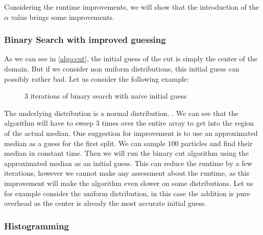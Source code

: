 \documentclass[]{article}
\begin{document}
Considering the runtime improvements, we will show that the introduction of the $\alpha$ value brings some improvements. 

\subsubsection{Binary Search with improved guessing}

As we can see in \ref{algo:cut}, the initial guess of the cut is simply the center of the domain. But if we consider non uniform distributions, this initial guess can possibly rather bad. Let us consider the following example:

\begin{figure}[H]
	\begin{center}
	\end{center}
	\caption{3 iterations of binary search with naive initial guess}\label{euclid}
\end{figure}

The underlying distribution is a normal distribution. . We can see that the algorithm will have to sweep 3 times over the entire array to get into the region of the actual median. One suggestion for improvement is to use an approximated median as a guess for the first split. We can sample 100 particles and find their median in constant time. Then we will run the binary cut algorithm using the approximated median as an initial guess. This can reduce the runtime by a few iterations, however we cannot make any assessment about the runtime, as this improvement will make the algorithm even slower on some distributions. Let us for example consider the uniform distribution, in this case the addition is pure overhead as the center is already the most accurate initial guess.


\subsubsection{Histogramming}
\end{document}
